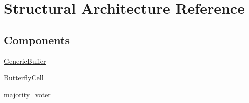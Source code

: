 \hypertarget{class_r_m_decoder_1_1_structural}{\section{Structural Architecture Reference}
\label{class_r_m_decoder_1_1_structural}
}
\subsection*{Components}
 \begin{DoxyCompactItemize}
\item 
\hypertarget{class_r_m_decoder_1_1_structural_ga26754353fa942392a9799290b42c41c7}{\hyperlink{group___r_m_decoder_ga26754353fa942392a9799290b42c41c7}{Generic\+Buffer}  {\bfseries }  }\label{class_r_m_decoder_1_1_structural_ga26754353fa942392a9799290b42c41c7}

\item 
\hypertarget{class_r_m_decoder_1_1_structural_ga78b932f12128347f9985cb5f28b83a4d}{\hyperlink{group___r_m_decoder_ga78b932f12128347f9985cb5f28b83a4d}{Butterfly\+Cell}  {\bfseries }  }\label{class_r_m_decoder_1_1_structural_ga78b932f12128347f9985cb5f28b83a4d}

\item 
\hypertarget{class_r_m_decoder_1_1_structural_gadabe01418633fc7a7416a2b27787c4f5}{\hyperlink{group___r_m_decoder_gadabe01418633fc7a7416a2b27787c4f5}{majority\+\_\+voter}  {\bfseries }  }\label{class_r_m_decoder_1_1_structural_gadabe01418633fc7a7416a2b27787c4f5}

\end{DoxyCompactItemize}
